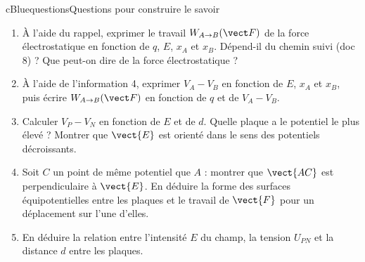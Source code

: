 \begin{rub}{cBlue}{questions}{Questions pour construire le savoir}
\begin{enumerate}
  \item {} À l’aide du rappel, exprimer le travail $\W{A}{B}$ de la force électrostatique en fonction de $q$, $E$, $x_A$ et $x_B$. Dépend-il du chemin suivi (doc 8) ? Que peut-on dire de la force électrostatique ?
  \item {} À l’aide de l’information 4, exprimer $V_A - V_B$ en fonction de $E$, $x_A$ et $x_B$, puis écrire $\W{A}{B}$ en fonction de $q$ et de $V_A - V_B$.
  \item {} Calculer $V_P - V_N$ en fonction de $E$ et de $d$. Quelle plaque a le potentiel le plus élevé ? Montrer que $\vect{E}$ est orienté dans le sens des potentiels décroissants.
  \item {} Soit $C$ un point de même potentiel que $A$ : montrer que $\vect{AC}$ est perpendiculaire à $\vect{E}$. En déduire la forme des surfaces équipotentielles entre les plaques et le travail de $\vect{F}$ pour un déplacement sur l’une d’elles.
  \item {} En déduire la relation entre l’intensité $E$ du champ, la tension $U_{PN}$ et la distance $d$ entre les plaques.
\end{enumerate}
\end{rub}

